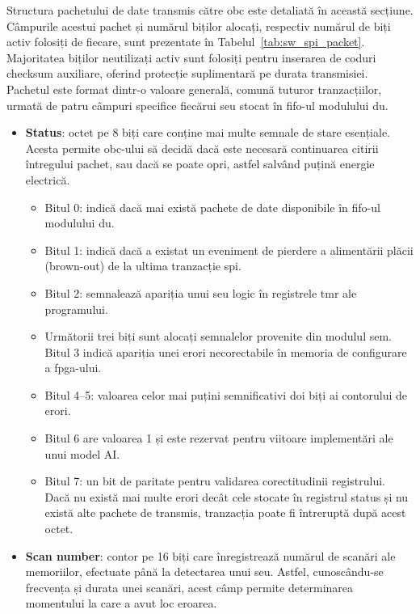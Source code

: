 \documentclass[12pt,a4paper]{report}
\begin{document}
Structura pachetului de date transmis către \gls{obc} este detaliată în această secțiune. Câmpurile acestui pachet și numărul biților alocați, respectiv numărul de biți activ folosiți de fiecare, sunt prezentate în Tabelul~\ref{tab:sw_spi_packet}. Majoritatea biților neutilizați activ sunt folosiți pentru inserarea de coduri checksum auxiliare, oferind protecție suplimentară pe durata transmisiei. Pachetul este format dintr-o valoare generală, comună tuturor tranzacțiilor, urmată de patru câmpuri specifice fiecărui \gls{seu} stocat în \gls{fifo}-ul modulului \gls{du}.
\begin{itemize}
    \item \textbf{Status}: octet pe 8 biți care conține mai multe semnale de stare esențiale. Acesta permite \gls{obc}-ului să decidă dacă este necesară continuarea citirii întregului pachet, sau dacă se poate opri, astfel salvând puțină energie electrică.
    \begin{itemize}
        \item Bitul 0: indică dacă mai există pachete de date disponibile în \gls{fifo}-ul modulului \gls{du}.
        \item Bitul 1: indică dacă a existat un eveniment de pierdere a alimentării plăcii (brown-out) de la ultima tranzacție \gls{spi}.
        \item Bitul 2: semnalează apariția unui \gls{seu} logic în registrele \gls{tmr} ale programului.
        \item Următorii trei biți sunt alocați semnalelor provenite din modulul \gls{sem}. Bitul 3 indică apariția unei erori necorectabile în memoria de configurare a \gls{fpga}-ului.
        \item Bitul 4--5: valoarea celor mai puțini semnificativi doi biți ai contorului de erori. 
        \item Bitul 6 are valoarea 1 și este rezervat pentru viitoare implementări ale unui model AI.
        \item Bitul 7: un bit de paritate pentru validarea corectitudinii registrului. Dacă nu există mai multe erori decât cele stocate în registrul status și nu există alte pachete de transmis, tranzacția poate fi întreruptă după acest octet. 
    \end{itemize}
    \item \textbf{Scan number}: contor pe 16 biți care înregistrează numărul de scanări ale memoriilor, efectuate până la detectarea unui \gls{seu}. Astfel, cunoscându-se frecvența și durata unei scanări, acest câmp permite determinarea momentului la care a avut loc eroarea.

\end{itemize}
\end{document}
